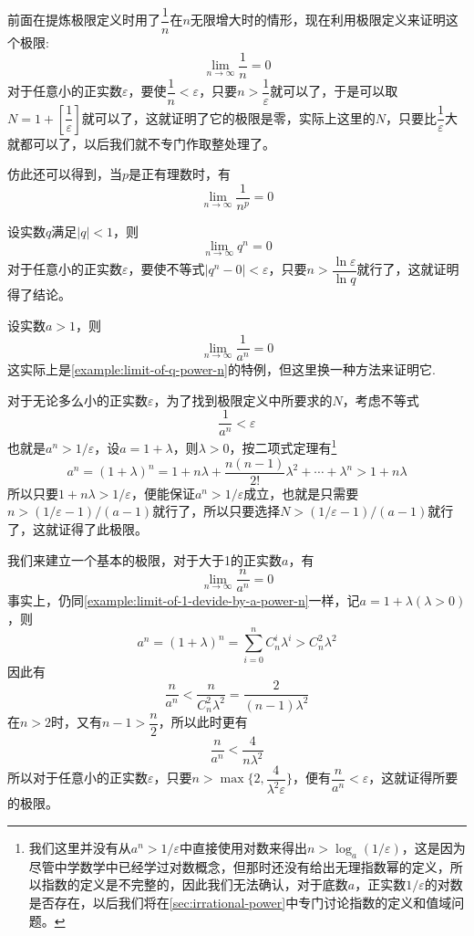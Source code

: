 \begin{example}
  \label{example:limit-of-1-devide-by-n-power-p}
  前面在提炼极限定义时用了$\dfrac{1}{n}$在$n$无限增大时的情形，现在利用极限定义来证明这个极限:
  \[ \lim_{n \to \infty} \frac{1}{n} = 0 \]
  对于任意小的正实数$\varepsilon$，要使$\dfrac{1}{n}<\varepsilon$，只要$n>\dfrac{1}{\varepsilon}$就可以了，于是可以取$N=1+\left[ \dfrac{1}{\varepsilon} \right]$就可以了，这就证明了它的极限是零，实际上这里的$N$，只要比$\dfrac{1}{\varepsilon}$大就都可以了，以后我们就不专门作取整处理了。

  仿此还可以得到，当$p$是正有理数时，有
  \[ \lim_{n \to \infty} \frac{1}{n^p} = 0 \]
\end{example}

\begin{example}
  \label{example:limit-of-q-power-n}
  设实数$q$满足$|q|<1$，则
  \[ \lim_{n \to \infty} q^n = 0 \]
  对于任意小的正实数$\varepsilon$，要使不等式$|q^n - 0| < \varepsilon$，只要$n>\dfrac{\ln{\varepsilon}}{\ln{q}}$就行了，这就证明得了结论。
\end{example}

\begin{example}
  \label{example:limit-of-1-devide-by-a-power-n}
  设实数$a>1$，则
  \[ \lim_{n \to \infty} \frac{1}{a^n} = 0 \]
  这实际上是\autoref{example:limit-of-q-power-n}的特例，但这里换一种方法来证明它.
  
  对于无论多么小的正实数$\varepsilon$，为了找到极限定义中所要求的$N$，考虑不等式
  \[ \frac{1}{a^n} < \varepsilon \]
  也就是$a^n>1/\varepsilon$，设$a=1+\lambda$，则$\lambda>0$，按二项式定理有\footnote{我们这里并没有从$a^n>1/\varepsilon$中直接使用对数来得出$n>\log_a{(1/\varepsilon)}$，这是因为尽管中学数学中已经学过对数概念，但那时还没有给出无理指数幂的定义，所以指数的定义是不完整的，因此我们无法确认，对于底数$a$，正实数$1/\varepsilon$的对数是否存在，以后我们将在\autoref{sec:irrational-power}中专门讨论指数的定义和值域问题。}
  \[ a^n = (1+\lambda)^n = 1 + n\lambda + \frac{n(n-1)}{2!}\lambda^2+\cdots+\lambda^n > 1+n \lambda \]
  所以只要$1+n\lambda>1/\varepsilon$，便能保证$a^n>1/\varepsilon$成立，也就是只需要$n > (1/\varepsilon-1) / (a-1)$就行了，所以只要选择$N>(1/\varepsilon-1)/(a-1)$就行了，这就证得了此极限。
\end{example}

\begin{example}
  \label{example:limit-of-n-devide-by-a-power-n}
  我们来建立一个基本的极限，对于大于1的正实数$a$，有
  \[ \lim_{n \to \infty} \frac{n}{a^n} = 0 \]
  事实上，仍同\autoref{example:limit-of-1-devide-by-a-power-n}一样，记$a=1+\lambda(\lambda>0)$，则
  \[ a^n=(1+\lambda)^n=\sum_{i=0}^nC_n^i\lambda^i > C_n^2 \lambda^2 \]
  因此有
  \[ \frac{n}{a^n} < \frac{n}{C_n^2 \lambda^2} = \frac{2}{(n-1)\lambda^2} \]
  在$n>2$时，又有$n-1>\dfrac{n}{2}$，所以此时更有
  \[ \frac{n}{a^n} < \frac{4}{n\lambda^2} \]
  所以对于任意小的正实数$\varepsilon$，只要$n>\max\{2,\dfrac{4}{\lambda^2\varepsilon}\}$，便有$\dfrac{n}{a^n} < \varepsilon$，这就证得所要的极限。
\end{example}

